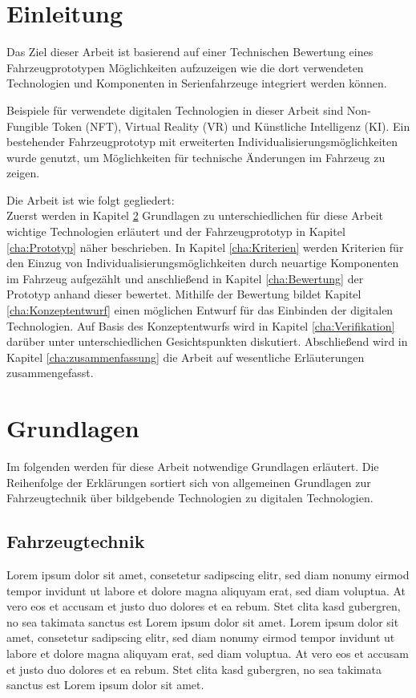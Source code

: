 \chapter{Einleitung}
\label{cha:Einleitung}
Das Ziel dieser Arbeit ist basierend auf einer Technischen Bewertung eines Fahrzeugprototypen Möglichkeiten aufzuzeigen wie die dort verwendeten Technologien und Komponenten in Serienfahrzeuge integriert werden können.

Beispiele für verwendete digitalen Technologien in dieser Arbeit sind Non-Fungible Token (NFT), Virtual Reality (VR) und Künstliche Intelligenz (KI).
Ein bestehender Fahrzeugprototyp mit erweiterten Individualisierungsmöglichkeiten wurde genutzt, um Möglichkeiten für technische Änderungen im Fahrzeug zu zeigen.

Die Arbeit ist wie folgt gegliedert:\\
Zuerst werden in Kapitel \ref{cha:Grundlagen} Grundlagen zu unterschiedlichen für diese Arbeit wichtige Technologien erläutert und der Fahrzeugprototyp in Kapitel \ref{cha:Prototyp} näher beschrieben. In Kapitel \ref{cha:Kriterien} werden Kriterien für den Einzug von Individualisierungsmöglichkeiten durch neuartige Komponenten im Fahrzeug aufgezählt und anschließend in Kapitel \ref{cha:Bewertung} der Prototyp anhand dieser bewertet. Mithilfe der Bewertung bildet Kapitel \ref{cha:Konzeptentwurf} einen möglichen Entwurf für das Einbinden der digitalen Technologien. Auf Basis des Konzeptentwurfs wird in Kapitel \ref{cha:Verifikation} darüber unter unterschiedlichen Gesichtspunkten diskutiert. Abschließend wird in Kapitel \ref{cha:zusammenfassung} die Arbeit auf wesentliche Erläuterungen zusammengefasst.

\chapter{Grundlagen}
\label{cha:Grundlagen}
Im folgenden werden für diese Arbeit notwendige Grundlagen erläutert. Die Reihenfolge der Erklärungen sortiert sich von allgemeinen Grundlagen zur Fahrzeugtechnik über bildgebende Technologien zu digitalen Technologien.
\section{Fahrzeugtechnik}
Lorem ipsum dolor sit amet, consetetur sadipscing elitr, sed diam nonumy eirmod tempor invidunt ut labore et dolore magna aliquyam erat, sed diam voluptua. At vero eos et accusam et justo duo dolores et ea rebum. Stet clita kasd gubergren, no sea takimata sanctus est Lorem ipsum dolor sit amet. Lorem ipsum dolor sit amet, consetetur sadipscing elitr, sed diam nonumy eirmod tempor invidunt ut labore et dolore magna aliquyam erat, sed diam voluptua. At vero eos et accusam et justo duo dolores et ea rebum. Stet clita kasd gubergren, no sea takimata sanctus est Lorem ipsum dolor sit amet.
